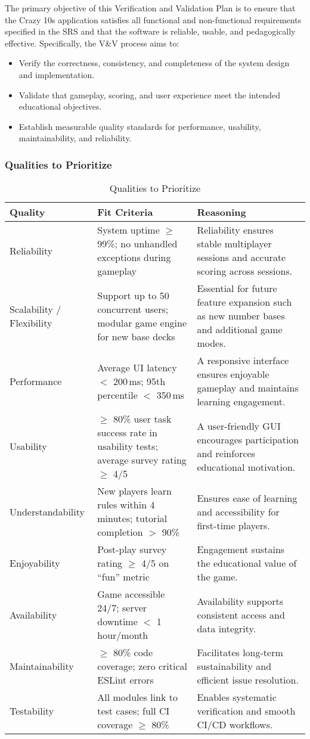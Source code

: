 \documentclass[12pt, titlepage]{article}
\begin{document}
The primary objective of this Verification and Validation Plan is to ensure that the Crazy 10s application satisfies all functional and non-functional requirements specified in the SRS and that the software is reliable, usable, and pedagogically effective.  
Specifically, the V\&V process aims to:
\begin{itemize}
    \item Verify the correctness, consistency, and completeness of the system design and implementation.  
    \item Validate that gameplay, scoring, and user experience meet the intended educational objectives.  
    \item Establish measurable quality standards for performance, usability, maintainability, and reliability.  
\end{itemize}

\subsubsection{Qualities to Prioritize}
\begin{table}[H]
\centering
\caption{Qualities to Prioritize}
\begin{tabularx}{\textwidth}{p{3cm}p{4.5cm}X}
\toprule
\textbf{Quality} & \textbf{Fit Criteria} & \textbf{Reasoning} \\
\midrule
Reliability & System uptime $\geq$ 99\%; no unhandled exceptions during gameplay & Reliability ensures stable multiplayer sessions and accurate scoring across sessions. \\
Scalability / Flexibility & Support up to 50 concurrent users; modular game engine for new base decks & Essential for future feature expansion such as new number bases and additional game modes. \\
Performance & Average UI latency $<$ 200\,ms; 95th percentile $<$ 350\,ms & A responsive interface ensures enjoyable gameplay and maintains learning engagement. \\
Usability & $\geq$ 80\% user task success rate in usability tests; average survey rating $\geq$ 4/5 & A user-friendly GUI encourages participation and reinforces educational motivation. \\
Understandability & New players learn rules within 4 minutes; tutorial completion $>$ 90\% & Ensures ease of learning and accessibility for first-time players. \\
Enjoyability & Post-play survey rating $\geq$ 4/5 on ``fun'' metric & Engagement sustains the educational value of the game. \\
Availability & Game accessible 24/7; server downtime $<$ 1 hour/month & Availability supports consistent access and data integrity. \\
Maintainability & $\geq$ 80\% code coverage; zero critical ESLint errors & Facilitates long-term sustainability and efficient issue resolution. \\
Testability & All modules link to test cases; full CI coverage $\geq$ 80\% & Enables systematic verification and smooth CI/CD workflows. \\
\bottomrule
\end{tabularx}
\end{table}
\end{document}
